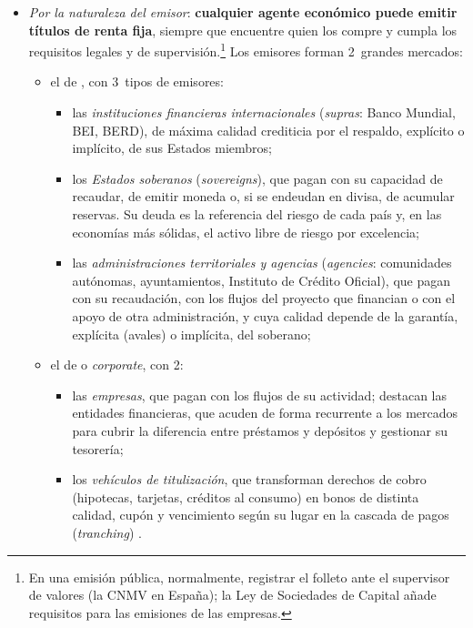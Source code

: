 \documentclass[11pt]{article}
\begin{document}
\begin{itemize}
\item \emph{Por la naturaleza del emisor}: \textbf{cualquier agente económico puede emitir títulos de renta fija}, siempre que encuentre quien los compre y cumpla los requisitos legales y de supervisión.\footnote{En una emisión pública, normalmente, registrar el folleto ante el supervisor de valores (la CNMV en España); la Ley de Sociedades de Capital añade requisitos para las emisiones de las empresas\nocite{LSC2010}.} Los emisores forman 2~grandes mercados:
  \begin{itemize}
  \item el de , con 3~tipos de emisores:
    \begin{itemize}
    \item las \emph{instituciones financieras internacionales} (\emph{supras}: Banco Mundial, BEI, BERD), de máxima calidad crediticia por el respaldo, explícito o implícito, de sus Estados miembros;
    \item los \emph{Estados soberanos} (\emph{sovereigns}), que pagan con su capacidad de recaudar, de emitir moneda o, si se endeudan en divisa, de acumular reservas. Su deuda es la referencia del riesgo de cada país y, en las economías más sólidas, el activo libre de riesgo por excelencia;
    \item las \emph{administraciones territoriales y agencias} (\emph{agencies}: comunidades autónomas, ayuntamientos, Instituto de Crédito Oficial), que pagan con su recaudación, con los flujos del proyecto que financian o con el apoyo de otra administración, y cuya calidad depende de la garantía, explícita (avales) o implícita, del soberano;
    \end{itemize}
  \item el de  o \emph{corporate}, con 2:
    \begin{itemize}
    \item las \emph{empresas}, que pagan con los flujos de su actividad; destacan las entidades financieras, que acuden de forma recurrente a los mercados para cubrir la diferencia entre préstamos y depósitos y gestionar su tesorería;
    \item los \emph{vehículos de titulización}, que transforman derechos de cobro (hipotecas, tarjetas, créditos al consumo) en bonos de distinta calidad, cupón y vencimiento según su lugar en la cascada de pagos (\emph{tranching}) .
    \end{itemize}
  \end{itemize}

\end{itemize}
\end{document}
